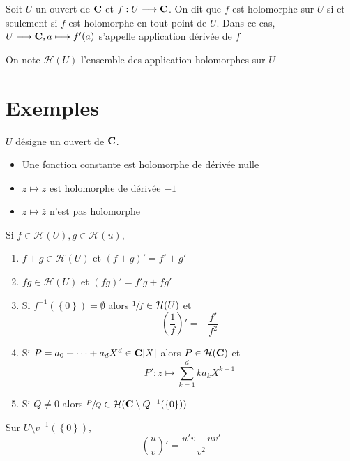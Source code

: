 \begin{dfn}
    Soit $U$ un ouvert de  $\mathbf C$ et $f:U\longrightarrow \mathbf C$. On dit que $f$ est holomorphe sur  $U$  si et seulement si $f$ est holomorphe en tout point de  $U$. Dans ce cas, $U\longrightarrow \mathbf C, a\longmapsto f'(a)$ s'appelle application dérivée de $f$ 

    On note $\mathcal  H(U)$ l'ensemble des application holomorphes sur $U$
\end{dfn}

\section{Exemples}

$U$ désigne un ouvert de $\mathbf C$.

\begin{itemize}
    \item Une fonction constante est holomorphe de dérivée nulle
    \item $z\longmapsto z$ est holomorphe de dérivée $-1$
    \item  $z\longmapsto \bar z$ n'est pas holomorphe
\end{itemize}

\begin{prop}
    Si $f \in  \mathcal  H(U), g \in \mathcal  H(u)$, \begin{enumerate}[label=(\alph*)]
        \item $f+g \in  \mathcal H(U)$ et $(f+g)'=f'+g'$
        \item  $fg \in  \mathcal H(U)$ et $(fg)'=f'g+fg'$
        \item  Si $f^{-1}( \left\{  0 \right\}  )=\emptyset$ alors $\sfrac1f \in  \mathcal  H(U)$ et \[
         \left( \frac{1}{f} \right)'=-\frac{f'}{f^2 }
        \] 
    \item Si  $P=a_0+\cdots +a_dX^d \in  \mathbf C[X]$ alors $P \in  \mathcal  H(\mathbf C)$ et \[
            P':z\longmapsto  \sum_{k=1}^{d} ka_kX^{k-1}
    \]
    \item Si $Q \neq 0$ alors $\sfrac PQ \in  \mathcal  H(\mathbf C \setminus Q^{-1}(\left\{ 0 \right\} ) )$
    \end{enumerate}
\end{prop}

\begin{rem}
    Sur $U \setminus  v^{-1}(\left\{ 0 \right\} )$,
\[
    \left( \frac{u}{v} \right)'=\frac{u'v-uv'}{v^2 }
\] 
\end{rem}

